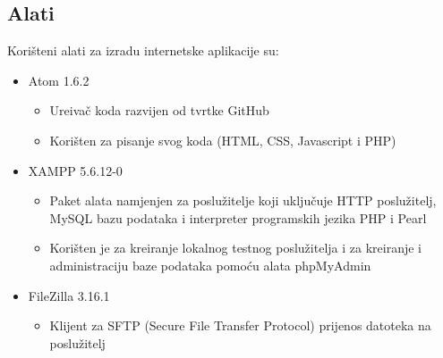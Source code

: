 \subsection{Alati}
Kori\v{s}teni alati za izradu internetske aplikacije su:
\begin{itemize}
	\item Atom 1.6.2 \cite{atom}
	\begin{itemize}
		\item Ure\dj iva\v{c} koda razvijen od tvrtke GitHub
		\item Kori\v{s}ten za pisanje svog koda (HTML, CSS, Javascript i PHP)
	\end{itemize}
	
	\item XAMPP 5.6.12-0 \cite{xampp}
	\begin{itemize}
		\item Paket alata namjenjen za poslu\v{z}itelje koji uklju\v{c}uje HTTP poslu\v{z}itelj, MySQL bazu podataka i interpreter programskih jezika PHP i Pearl
		\item Kori\v{s}ten je za kreiranje lokalnog testnog poslu\v{z}itelja i za kreiranje i administraciju baze podataka pomo\'{c}u alata phpMyAdmin
	\end{itemize}
	
	\item FileZilla 3.16.1 \cite{filezilla}
	\begin{itemize}
		\item Klijent za SFTP (Secure File Transfer Protocol) prijenos datoteka na poslu\v{z}itelj
	\end{itemize}
\end{itemize}


